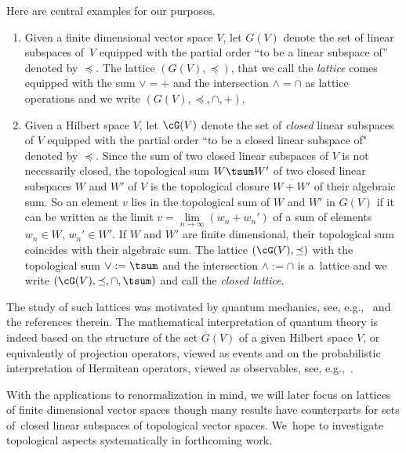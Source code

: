 \documentclass[10pt,a4paper]{amsart}
\numberwithin{equation}{section}
\begin{document}
Here are central examples for our purposes.
\begin{Example}\label{ex:GV}\qquad
\begin{enumerate}\itemsep=0pt
\item[$(a)$] %
 Given a finite dimensional vector space $V$, let $G(V)$ denote the set of linear subspaces of~$V$ equipped with
 the partial order ``to be a linear subspace of'' denoted by $\preceq$. The lattice $\left(G(V), \preceq\right)$, that we call the {\it \subsp lattice} comes equipped with
 the sum $\vee=+$ and the intersection $\wedge=\cap $ as lattice operations and we write $(G(V), \preceq, \cap, +)$.
\item[$(b)$]
Given a Hilbert space $V$, let $\cG(V)$ denote the set of {\it closed} linear subspaces of $V$ equipped with
the partial order ``to be a closed linear subspace of" denoted by $\preceq$. Since the sum of two closed linear subspaces of $V$ is not necessarily closed, the topological sum $W\tsum W'$ of two closed linear subspaces $W$ and $W'$ of $V$ is the topological closure $\overline{W+W'}$ of their algebraic sum. So an element $v$ lies in the topological sum of $W $ and $W'$ in $G(V)$ if it can be written as the limit $v=\underset{n\to \infty}{\lim}(w_n+w_n')$ of a sum of elements $w_n\in W$, $w_n'\in W'$. If $W$ and $W'$ are finite dimensional, their topological sum coincides with their algebraic sum.
The lattice $\left(\cG(V), \preceq\right)$ with the topological sum $\vee:=\tsum$ and the intersection $\wedge:=\cap $ is a~lattice and we write $(\cG(V), \preceq, \cap, \tsum)$ and call the {\it closed \subsp lattice}. 
\end{enumerate}
The study of such lattices was motivated by quantum mechanics, see, e.g.,~\cite{CL,EGL} and the references therein. The mathematical interpretation of quantum theory is indeed based on the structure of the set $\overline G(V)$ of a given Hilbert space $V$, or equivalently of projection operators, viewed as events and on the probabilistic interpretation of Hermitean operators, viewed as observables,
see, e.g.,~\cite[Section~16]{K}.
\end{Example}

\begin{Remark}
With the applications to renormalization in mind, we will later focus on \subsp lattices of finite
dimensional vector spaces though many results have counterparts for
sets of~closed linear subspaces of topological vector spaces. We~hope to investigate topological aspects systematically in forthcoming work.
\end{Remark}
\end{document}
